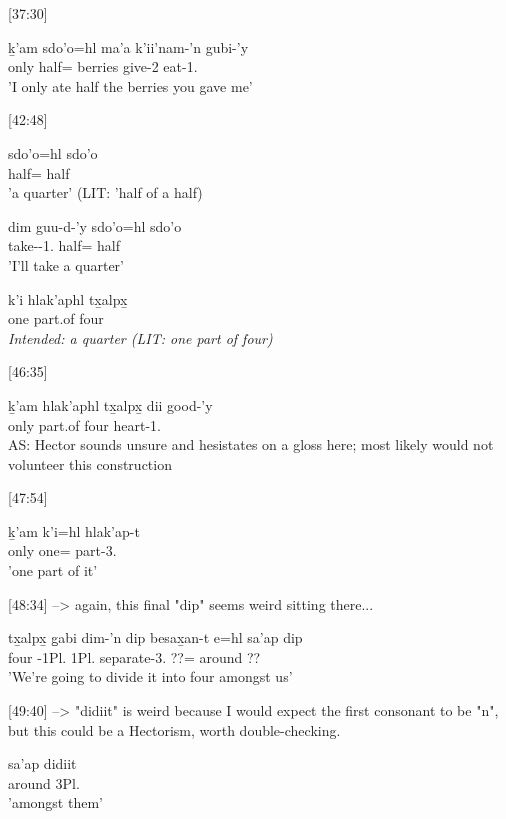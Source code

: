 [37:30]
\begin{exe}
\ex \gll ḵ'am  sdo'o=hl ma'a k'ii'nam-'n gubi-'y \\
only half=\Cn{} berries give-2\Ii{} eat-1.\Ii{}\\
'I only ate half the berries you gave me'
\end{exe}

[42:48]
\begin{exe}
\ex \begin{xlist}
\item \gll sdo'o=hl sdo'o\\
half=\Cn{} half\\
'a quarter' (LIT: 'half of a half)
\item \gll dim guu-d-'y sdo'o=hl sdo'o\\
\Fut{} take-\T{}-1.\Ii{} half=\Cn{} half\\
'I'll take a quarter'
\item \gll * k'i hlak'aphl tx̱alpx̱ \\
{} one part.of four\\
\textit{Intended: a quarter (LIT: one part of four)}
\end{xlist}
\end{exe}

[46:35]
\begin{exe}
\ex \gll ḵ'am hlak'aphl tx̱alpx̱ dii good-'y\\
only part.of four \Foc{} heart-1.\Ii{}\\
AS: Hector sounds unsure and hesistates on a gloss here; most likely would not volunteer this construction
\end{exe}

[47:54]
\begin{exe}
\ex \gll ḵ'am k'i=hl hlak'ap-t\\
only one=\Cn{} part-3.\Ii{}\\
'one part of it'
\end{exe}

[48:34] --> again, this final "dip" seems weird sitting there...
\begin{exe}
\ex \gll tx̱alpx̱ g̱abi dim-'n dip besax̱an-t e=hl sa'ap dip\\
four \Cnt{} \Fut{}-1Pl.\I{} 1Pl.\I{} separate-3.\Ii{} ??=\Cn{} around ??\\
'We're going to divide it into four amongst us'
\end{exe}

[49:40] --> "didiit" is weird because I would expect the first consonant to be "n", but this could be a Hectorism, worth double-checking.
\begin{exe}
\ex \gll sa'ap didiit\\
around 3Pl.\Iii{}\\
'amongst them'
\end{exe}

